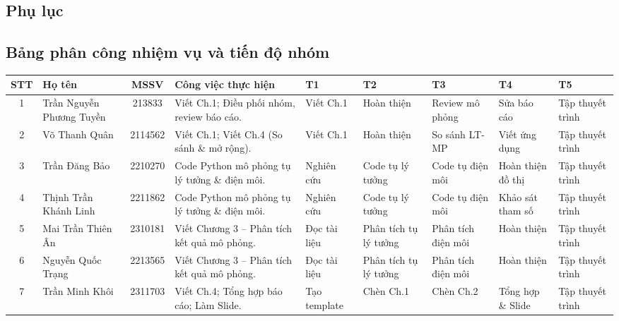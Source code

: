 \begin{landscape}
\section{Phụ lục}

\thispagestyle{empty} %

\subsection{Bảng phân công nhiệm vụ và tiến độ nhóm}
\begin{center}
\renewcommand{\arraystretch}{1.5}
\begin{tabularx}{\linewidth}{|c|p{2.5cm}|c|X|*{5}{>{\centering\arraybackslash}p{1.2cm}|}}
\hline
\textbf{STT} & \textbf{Họ tên} & \textbf{MSSV} & \textbf{Công việc thực hiện} & \textbf{T1} & \textbf{T2} & \textbf{T3} & \textbf{T4} & \textbf{T5} \\ \hline
1 & Trần Nguyễn Phương Tuyền  & 213833 & Viết Ch.1; Điều phối nhóm, review báo cáo. & Viết Ch.1 & Hoàn thiện & Review mô phỏng & Sửa báo cáo & Tập thuyết trình \\ \hline
2 & Võ Thanh Quân & 2114562 & Viết Ch.1; Viết Ch.4 (So sánh \& mở rộng). & Viết Ch.1 & Hoàn thiện & So sánh LT-MP & Viết ứng dụng & Tập thuyết trình \\ \hline
3 & Trần Đăng Bảo & 2210270 & Code Python mô phỏng tụ lý tưởng \& điện môi. & Nghiên cứu & Code tụ lý tưởng & Code tụ điện môi & Hoàn thiện đồ thị & Tập thuyết trình \\ \hline
4 & Thịnh Trần Khánh Linh  & 2211862 & Code Python mô phỏng tụ lý tưởng \& điện môi. & Nghiên cứu & Code tụ lý tưởng & Code tụ điện môi & Khảo sát tham số & Tập thuyết trình \\ \hline
5 & Mai Trần Thiên Ân  & 2310181 & Viết Chương 3 – Phân tích kết quả mô phỏng. & Đọc tài liệu & Phân tích tụ lý tưởng & Phân tích điện môi & Hoàn thiện & Tập thuyết trình \\ \hline
6 & Nguyễn Quốc Trạng  & 2213565 & Viết Chương 3 – Phân tích kết quả mô phỏng. & Đọc tài liệu & Phân tích tụ lý tưởng & Phân tích điện môi & Hoàn thiện & Tập thuyết trình \\ \hline
7 & Trần Minh Khôi  & 2311703 & Viết Ch.4; Tổng hợp báo cáo; Làm Slide. & Tạo template & Chèn Ch.1 & Chèn Ch.2 & Tổng hợp \& Slide & Tập thuyết trình \\ \hline
\end{tabularx}
\end{center}


\end{landscape}
